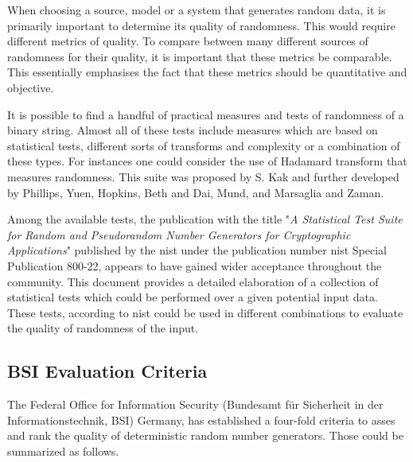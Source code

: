 When choosing a source, model or a system that generates random data, it is primarily important to determine its quality of randomness. This would require different metrics of quality. To compare between many different sources of randomness for their quality, it is important that these metrics be comparable. This essentially emphasises the fact that these metrics should be quantitative and objective.

It is possible to find a handful of practical measures and tests of randomness of a binary string. Almost all of these tests include measures which are based on statistical tests, different sorts of transforms and complexity or a combination of these types. For instances one could consider the use of Hadamard transform that measures randomness. This suite was proposed by S. Kak and further developed by Phillips, Yuen, Hopkins, Beth and Dai, Mund, and Marsaglia and Zaman\cite{web_rand_tests_lit}.

Among the available tests, the publication with the title "\textit{A Statistical Test Suite for Random and Pseudorandom Number Generators for Cryptographic Applications}" published by the \acrshort{nist} under the publication number \acrshort{nist} Special Publication 800-22, appears to have gained wider acceptance throughout the community. This document provides a detailed elaboration of a collection of statistical tests which could be performed over a given potential input data. These tests, according to \acrshort{nist} could be used in different combinations to evaluate the quality of randomness of the input.

\subsection{BSI Evaluation Criteria}

The Federal Office for Information Security (Bundesamt für Sicherheit in der Informationstechnik, BSI) Germany, has established a four-fold criteria to asses and rank the quality of deterministic random number generators\cite{art_schindler_eval_meth}. Those could be summarized as follows.

